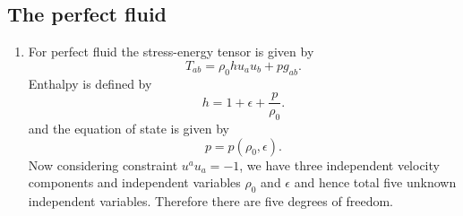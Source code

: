 \documentclass[10pt]{article}
\begin{document}
\subsection{The perfect fluid}
\label{sec:perfect-fluid}
\begin{enumerate}
\item For perfect fluid the stress-energy tensor is given by
  \begin{equation}
    \label{eq:stress-energy-perfect-fluid}
    T_{ab} = \rho_0 h u_a u_b + p g_{ab}. 
  \end{equation}
  Enthalpy is defined by
  \begin{equation}
    \label{eq:enthalpy}
    h = 1 + \epsilon + \frac{p}{\rho_0}.
  \end{equation}
  and the equation of state is given by 
  \begin{equation}
    \label{eq:equation-of-state}
    p = p(\rho_0, \epsilon).
  \end{equation}
  Now considering constraint $u^au_a = -1$, we have three independent velocity components and independent variables $\rho_0$ and $\epsilon$ and hence total five unknown independent variables. Therefore there are five degrees of freedom.


\end{enumerate}
\end{document}
